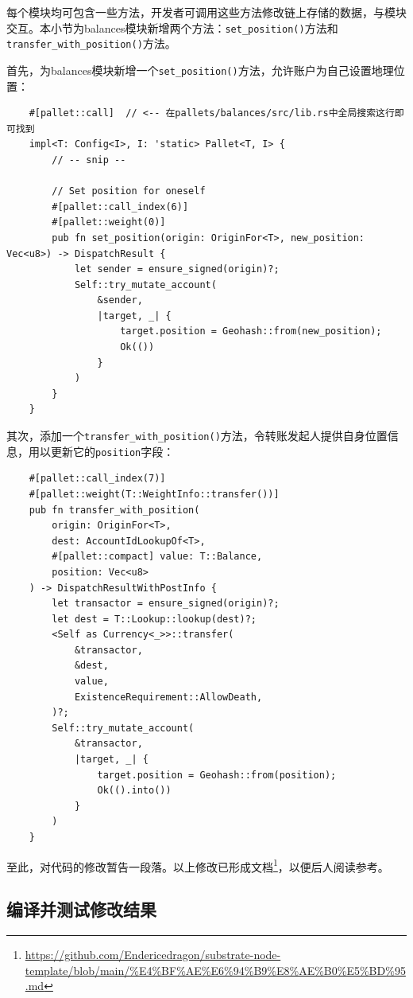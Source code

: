每个模块均可包含一些方法，开发者可调用这些方法修改链上存储的数据，与模块交互。本小节为balances模块新增两个方法：\verb|set_position()|方法和\verb|transfer_with_position()|方法。

首先，为balances模块新增一个\verb|set_position()|方法，允许账户为自己设置地理位置：

\begin{lstlisting}
    #[pallet::call]  // <-- 在pallets/balances/src/lib.rs中全局搜索这行即可找到
    impl<T: Config<I>, I: 'static> Pallet<T, I> {
        // -- snip --

        // Set position for oneself
        #[pallet::call_index(6)]
        #[pallet::weight(0)]
        pub fn set_position(origin: OriginFor<T>, new_position: Vec<u8>) -> DispatchResult {
            let sender = ensure_signed(origin)?;
            Self::try_mutate_account(
                &sender,
                |target, _| {
                    target.position = Geohash::from(new_position);
                    Ok(())
                }
            )
        }
    }
\end{lstlisting}

其次，添加一个\verb|transfer_with_position()|方法，令转账发起人提供自身位置信息，用以更新它的\verb|position|字段：

\begin{lstlisting}
    #[pallet::call_index(7)]
    #[pallet::weight(T::WeightInfo::transfer())]
    pub fn transfer_with_position(
        origin: OriginFor<T>,
        dest: AccountIdLookupOf<T>,
        #[pallet::compact] value: T::Balance,
        position: Vec<u8>
    ) -> DispatchResultWithPostInfo {
        let transactor = ensure_signed(origin)?;
        let dest = T::Lookup::lookup(dest)?;
        <Self as Currency<_>>::transfer(
            &transactor,
            &dest,
            value,
            ExistenceRequirement::AllowDeath,
        )?;
        Self::try_mutate_account(
            &transactor,
            |target, _| {
                target.position = Geohash::from(position);
                Ok(().into())
            }
        )
    }
\end{lstlisting}

至此，对代码的修改暂告一段落。以上修改已形成文档\footnote{\url{https://github.com/Endericedragon/substrate-node-template/blob/main/\%E4\%BF\%AE\%E6\%94\%B9\%E8\%AE\%B0\%E5\%BD\%95.md}}，以便后人阅读参考。

\subsection{编译并测试修改结果}

